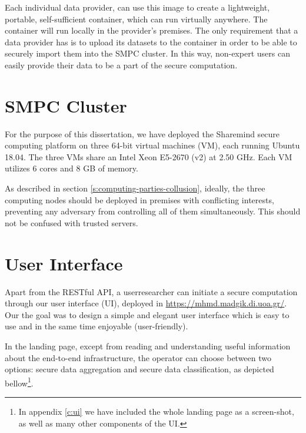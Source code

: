 Each individual data provider, can use this image to create a lightweight, portable, self-sufficient container, which can run virtually anywhere.
The container will run locally in the provider's premises.
The only requirement that a data provider has is to upload its datasets to the container in order to be able to securely import them into the SMPC cluster. In this way, non-expert users can easily provide their data to be a part of the secure computation.




\section{SMPC Cluster}\label{s:impl-smpc-cluster}
For the purpose of this dissertation, we have deployed the Sharemind secure computing platform on three 64\hyp bit virtual machines (VM), each running Ubuntu 18.04.
The three VMs share an Intel Xeon E5-2670 (v2) at 2.50 GHz.
Each VM utilizes 6 cores and 8 GB of memory.

As described in section \ref{s:computing-parties-collusion}, ideally, the three computing nodes should be deployed in premises with conflicting interests, preventing any adversary from controlling all of them simultaneously.
This should not be confused with trusted servers.





\section{User Interface}\label{s:impl-ui}
Apart from the RESTful API, a user\myslash researcher can initiate a secure computation through our user interface (UI), deployed in \href{https://mhmd.madgik.di.uoa.gr/}{https://mhmd.madgik.di.uoa.gr/}.
Our the goal was to design a simple and elegant user interface which is easy to use and in the same time enjoyable (user\hyp friendly).


In the landing page, except from reading and understanding useful information about the end\hyp to\hyp end infrastructure, the operator can choose between two options: secure data aggregation and secure data classification, as depicted bellow\footnote{In appendix \ref{c:ui} we have included the whole landing page as a screen\hyp shot, as well as many other components of the UI.}.

